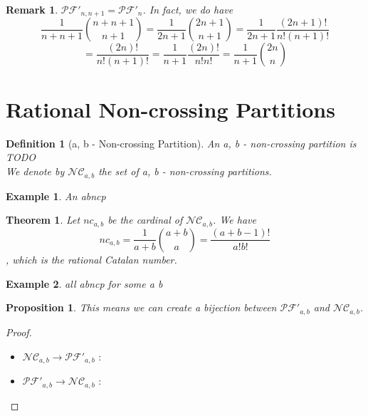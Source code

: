 \documentclass[12pt]{report}
\newtheorem{theorem}{Theorem}
\newtheorem*{prop}{Proposition}
\newtheorem{definition}{Definition}
\newtheorem*{example}{Example}
\newtheorem*{rem}{Remark}
\begin{document}
\begin{rem}
    $\mathcal{PF'}_{n,n+1} = \mathcal{PF'}_n$.
    In fact, we do have
    $$\frac{1}{n + n + 1} \binom{n + n + 1}{n + 1}
    = \frac{1}{2n + 1} \binom {2n + 1}{n + 1}
    = \frac{1}{2n + 1} \frac{(2n + 1)!}{n ! (n+1)!}$$
    $$= \frac{(2n)!}{n!(n+1)!}
    = \frac{1}{n+1} \frac{(2n)!}{n!n!}
    = \frac{1}{n+1} \binom{2n}{n}$$
\end{rem}

\section{Rational Non-crossing Partitions}


\begin{definition}[a, b - Non-crossing Partition]
    An \emph{a, b - non-crossing partition} is
    TODO\\
    We denote by $\mathcal{NC}_{a,b}$ the set of 
    a, b - non-crossing partitions.
\end{definition}

\begin{example}
    An abncp
\end{example}

\begin{theorem}
    Let $nc_{a,b}$ be the cardinal of $\mathcal{NC}_{a,b}$.
    We have $$nc_{a,b} = \frac{1}{a+b} \binom{a+b}{a} = 
    \frac{(a+b-1)!}{a!b!}$$, which is the rational Catalan
    number.
\end{theorem}

\begin{example}
    all abncp for some a b
\end{example}

\begin{prop}
    This means we can create a \emph{bijection} between
    $\mathcal{PF'}_{a,b}$ and $\mathcal{NC}_{a,b}$.
\end{prop}

\begin{proof}
    ~\\
\begin{itemize}
    \item $\mathcal{NC}_{a,b} \to \mathcal{PF'}_{a,b}$ :
    
    \item $\mathcal{PF'}_{a,b} \to \mathcal{NC}_{a,b}$ :
\end{itemize}
\end{proof}
\end{document}
